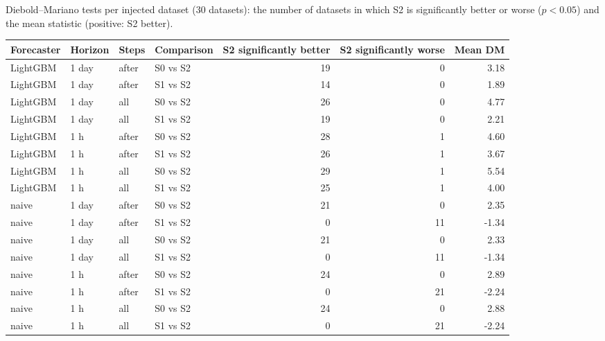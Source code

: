 \documentclass[11pt,a4paper]{article}
\makeatletter
\newenvironment{stable}{\par\addvspace{8pt}\noindent\begin{minipage}{\textwidth}\def\@captype{table}\centering}{\end{minipage}\par\addvspace{8pt}}
\makeatother
\begin{document}
\begin{stable}
\caption{Diebold--Mariano tests per injected dataset (30 datasets): the number of datasets in which S2 is significantly better or worse ($p < 0.05$) and the mean statistic (positive: S2 better).}\label{tab:s-dm30}
\scriptsize\setlength{\tabcolsep}{4pt}
\begin{tabular}{@{}l l l l r r r@{}}
\toprule
Forecaster & Horizon & Steps & Comparison & S2 significantly better & S2 significantly worse & Mean DM \\
\midrule
LightGBM & 1 day & after & S0 vs S2 & 19 & 0 & 3.18 \\
LightGBM & 1 day & after & S1 vs S2 & 14 & 0 & 1.89 \\
LightGBM & 1 day & all & S0 vs S2 & 26 & 0 & 4.77 \\
LightGBM & 1 day & all & S1 vs S2 & 19 & 0 & 2.21 \\
LightGBM & 1 h & after & S0 vs S2 & 28 & 1 & 4.60 \\
LightGBM & 1 h & after & S1 vs S2 & 26 & 1 & 3.67 \\
LightGBM & 1 h & all & S0 vs S2 & 29 & 1 & 5.54 \\
LightGBM & 1 h & all & S1 vs S2 & 25 & 1 & 4.00 \\
naive & 1 day & after & S0 vs S2 & 21 & 0 & 2.35 \\
naive & 1 day & after & S1 vs S2 & 0 & 11 & -1.34 \\
naive & 1 day & all & S0 vs S2 & 21 & 0 & 2.33 \\
naive & 1 day & all & S1 vs S2 & 0 & 11 & -1.34 \\
naive & 1 h & after & S0 vs S2 & 24 & 0 & 2.89 \\
naive & 1 h & after & S1 vs S2 & 0 & 21 & -2.24 \\
naive & 1 h & all & S0 vs S2 & 24 & 0 & 2.88 \\
naive & 1 h & all & S1 vs S2 & 0 & 21 & -2.24 \\
\bottomrule
\end{tabular}
\end{stable}
\end{document}
